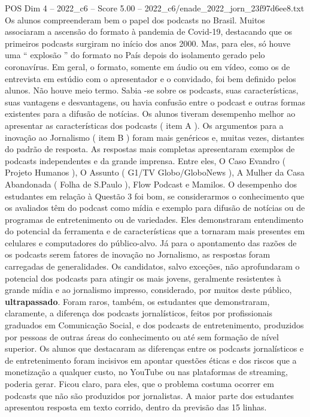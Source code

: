 \begin{textsample}{POS Dim 4 – 2022\_c6 – Score 5.00 – 2022\_c6/enade\_2022\_jorn\_23f97d6ee8.txt}
Os alunos compreenderam bem o papel dos podcasts no Brasil.
Muitos associaram a ascensão do formato à pandemia de Covid-19, destacando que os primeiros podcasts surgiram no início dos anos 2000.
Mas, para eles, só houve uma “ explosão ” do formato no País depois do isolamento gerado pelo coronavírus.
Em geral, o formato, somente em áudio ou em vídeo, como os de entrevista em estúdio com o apresentador e o convidado, foi bem definido pelos alunos.
Não houve meio termo.
Sabia -se sobre os podcasts, suas características, suas vantagens e desvantagens, ou havia confusão entre o podcast e outras formas existentes para a difusão de notícias.
Os alunos tiveram desempenho melhor ao apresentar as características dos podcasts ( item A ).
Os argumentos para a inovação ao Jornalismo ( item B ) foram mais genéricos e, muitas vezes, distantes do padrão de resposta.
As respostas mais completas apresentaram exemplos de podcasts independentes e da grande imprensa.
Entre eles, O Caso Evandro ( Projeto Humanos ), O Assunto ( G1/TV Globo/GloboNews ), A Mulher da Casa Abandonada ( Folha de S.Paulo ), Flow Podcast e Mamilos.
O desempenho dos estudantes em relação à Questão 3 foi bom, se considerarmos o conhecimento que os avaliados têm do podcast como mídia e exemplo para difusão de notícias ou de programas de entretenimento ou de variedades.
Eles demonstraram entendimento do potencial da ferramenta e de características que a tornaram mais presentes em celulares e computadores do público-alvo.
Já para o apontamento das razões de os podcasts serem fatores de inovação no Jornalismo, as respostas foram carregadas de generalidades.
Os candidatos, salvo exceções, não aprofundaram o potencial dos podcasts para atingir os mais jovens, geralmente resistentes à grande mídia e ao jornalismo impresso, considerado, por muitos deste público, \textbf{ultrapassado}.
Foram raros, também, os estudantes que demonstraram, claramente, a diferença dos podcasts jornalísticos, feitos por profissionais graduados em Comunicação Social, e dos podcasts de entretenimento, produzidos por pessoas de outras áreas do conhecimento ou até sem formação de nível superior.
Os alunos que destacaram as diferenças entre os podcasts jornalísticos e de entretenimento foram incisivos em apontar questões éticas e dos riscos que a monetização a qualquer custo, no YouTube ou nas plataformas de streaming, poderia gerar.
Ficou claro, para eles, que o problema costuma ocorrer em podcasts que não são produzidos por jornalistas.
A maior parte dos estudantes apresentou resposta em texto corrido, dentro da previsão das 15 linhas.

\end{textsample}
